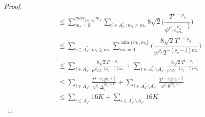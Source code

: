 \begin{proof}
\begin{align*}
&\leq\sum_{m_{*}=0}^{max_{j\in A^{'}_{s^{*}}}m_{j}}\sum_{i\in A^{''}_{s^{*}}:m_{i} \geq m_{*}}8\sqrt{2}\bigg(\dfrac{T^{1-\rho_{a}}}{\psi^{\rho_{a}}\epsilon_{m_{*}}^{\rho_{a}-\frac{1}{2}}} \bigg)\\
&\leq\sum_{i\in A^{''}_{s^{*}}:m_{i} \geq m_{*}}\sum_{m_{*}=0}^{\min{\lbrace m_{i},m_{b}\rbrace}}\bigg(\dfrac{8\sqrt{2} T^{1-\rho_{a}}}{\psi^{\rho_{a}}2^{-(\rho_{a}-\frac{1}{2})m_{*}}} \bigg)\\
&\!\leq\!\!\sum_{i\in A^{'}_{s^{*}}}\frac{8\sqrt{2} T^{1-\rho_{a}}}{\psi^{\rho_{a}}2^{-(\rho_{a}-\frac{1}{2})m_{*}}}\! +\!\!\!\sum_{i\in A^{''}_{s^{*}}\setminus A^{'}_{s^{*}}}\!\frac{8\sqrt{2} T^{1-\rho_{a}}}{\psi^{\rho_{a}}2^{-(\rho_{a}-\frac{1}{2})m_{b}}} \\
&\!\leq\!\!\sum_{i\in A^{'}_{s^{*}}}\frac{T^{1-\rho_{a}}2^{\rho_{a}+\frac{7}{2}}}{\psi^{\rho_{a}}\Delta_{i}^{2\rho_{a}-1}} \!+\!\!\!\sum_{i\in A^{''}_{s^{*}}\setminus A^{'}_{s^{*}}}\!\!\frac{T^{1-\rho_{a}}2^{\rho_{a}+\frac{7}{2}}}{\psi^{\rho_{a}}b^{2\rho_{a}-1}} \\
& \leq \sum_{i\in A^{'}_{s^{*}}} 16K \!+\!\!\!\sum_{i\in A^{''}_{s^{*}}\setminus A^{'}_{s^{*}}}\!\! 16K
\end{align*}



\end{proof}

